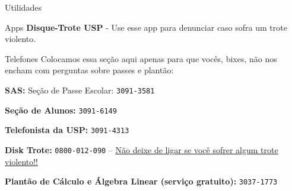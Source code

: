 \begin{secao}{Utilidades}
\begin{subsecao}{Apps}
{\bf Disque-Trote USP} - Use esse app para denunciar caso sofra um trote violento.

\end{subsecao}

\begin{subsecao}{Telefones}
Colocamos essa seção aqui apenas para que vocês, bixes, não nos encham com perguntas
sobre passes e plantão:

{\bf SAS:} Seção de Passe Escolar: {\tt 3091-3581}

{\bf Seção de Alunos:} {\tt 3091-6149}

{\bf Telefonista da USP:} {\tt 3091-4313}

{\bf Disk Trote:} {\tt 0800-012-090} -- \underline{Não deixe de ligar se você sofrer algum trote violento!!}

{\bf Plantão de Cálculo e Álgebra Linear (serviço gratuito):} {\tt 3037-1773}

\end{subsecao}
\end{secao}
